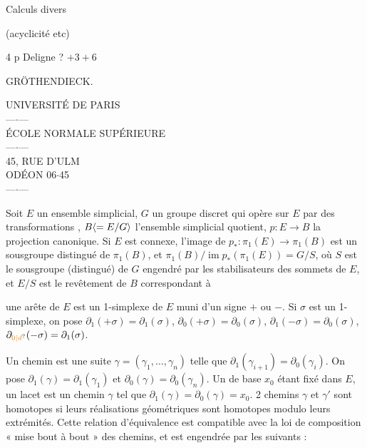 
Calculs divers

(acyclicité  etc)

4 p Deligne ? $+ 3 + 6$




GRÖTHENDIECK.

\begin{center}
UNIVERSITÉ DE PARIS\\
---$\cdot$---\\
ÉCOLE NORMALE SUPÉRIEURE\\
---$\cdot$---\\
45, RUE D'ULM\\
ODÉON 06$\cdot$45\\
---$\cdot$---
\end{center}

 Soit $E$ un ensemble simplicial,  $G$ un groupe discret qui opère sur $E$ par des transformations , $B\inserted{=E/G}$ l'ensemble simplicial quotient,  $p:E\to B$ la projection canonique. Si $E$ est connexe, l'image de $p_*:\pi_1(E)\longrightarrow\pi_1(B)$ est un sousgroupe distingué de $\pi_1(B)$, et $\pi_1(B)/\operatorname{im}p_*(\pi_1(E))=G/S$, où $S$ est le sousgroupe (distingué) de $G$ engendré par les stabilisateurs des sommets de $E$, et $E/S$ est le revêtement  de $B$ correspondant à 

 une arête de $E$ est un 1-simplexe de $E$ muni d'un signe $+$ ou $-$. Si $\sigma$ est un 1-simplexe, on pose $\partial_1(+\sigma)=\partial_1(\sigma)$, $\partial_0(+\sigma)=\partial_0(\sigma)$, $\partial_1(-\sigma)=\partial_0(\sigma)$, $\partial_{\unsure{0|d}}(-\sigma)=\partial_1(\sigma)$.

Un chemin est une suite  $\gamma=(\gamma_1,\ldots,\gamma_n)$ telle que $\partial_1(\gamma_{i+1})=\partial_0(\gamma_i)$. On pose $\partial_1(\gamma)=\partial_1(\gamma_1)$ et $\partial_0(\gamma)=\partial_0(\gamma_n)$. Un   de base $x_0$ étant fixé dans $E$, un lacet est un chemin $\gamma$ tel que $\partial_1(\gamma)=\partial_0(\gamma)=x_0$. 2 chemins $\gamma$ et $\gamma'$ sont homotopes si leurs réalisations géométriques sont homotopes modulo leurs extrémités. Cette relation d'équivalence est compatible avec la loi de composition « mise bout à bout » des chemins, et est engendrée par les suivants :

